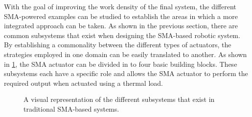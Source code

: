 With the goal of improving the work density of the final system, the different SMA-powered examples can be studied to establish the areas in which a more integrated approach can be taken. As shown in the previous section, there are common subsystems that exist when designing the SMA-based robotic system. By establishing a commonality between the different types of actuators, the strategies employed in one domain can be easily translated to another. As shown in \cref{fig:hexahon-base-layer}, the SMA actuator can be divided in to four basic building blocks. These subsystems each have a specific role and allows the SMA actuator to perform the required output when actuated using a thermal load.

\begin{figure}[hbt] %
  \centering
  \caption{A visual representation of the different subsystems that exist in traditional SMA-based systems.}
  \label{fig:hexahon-base-layer}
\end{figure}

